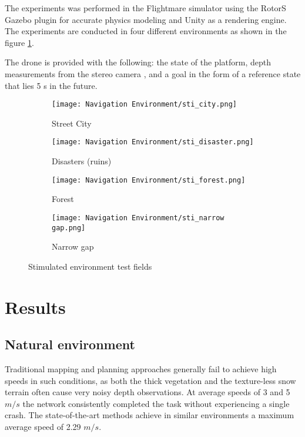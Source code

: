 The experiments was performed in the
Flightmare simulator using the RotorS Gazebo plugin for
accurate physics modeling and Unity as a rendering engine. The
experiments are conducted in four different environments as shown in the figure \ref{fig:stimulated envt}.

The drone is provided with the following: the state of the
platform, depth measurements from the stereo camera \cite{stereoMatching}, and a goal in
the form of a reference state that lies 5 s in the future.

\begin{figure}[!h]
	\centering
	\begin{subfigure}[b]{0.48\textwidth}
		\centering
		\texttt{[image: Navigation Environment/sti\_city.png]}
		\caption{Street City}
	\end{subfigure}
	\hfill
	\begin{subfigure}[b]{0.48\textwidth}
		\centering
		\texttt{[image: Navigation Environment/sti\_disaster.png]}
		\caption{Disasters (ruins)}
	\end{subfigure}
	\hfill	
	\begin{subfigure}[b]{0.48\textwidth}
		\centering
		\texttt{[image: Navigation Environment/sti\_forest.png]}
		\caption{Forest}
	\end{subfigure}
	\hfill
	\begin{subfigure}[b]{0.48\textwidth}
		\centering
		\texttt{[image: Navigation Environment/sti\_narrow gap.png]}
		\caption{Narrow gap}
	\end{subfigure}
	
	\caption{Stimulated environment test fields}
	\label{fig:stimulated envt}
\end{figure}


\section{Results}

\subsection{Natural environment}
Traditional mapping and planning approaches generally fail to achieve high speeds in such conditions, as
both the thick vegetation and the texture-less snow terrain often cause
very noisy depth observations. At average speeds of 3 and 5 $m/s$ the network consistently completed the task without experiencing a single crash. 
The state-of-the-art methods achieve in similar environments a maximum average
speed of 2.29 $m/s$.

